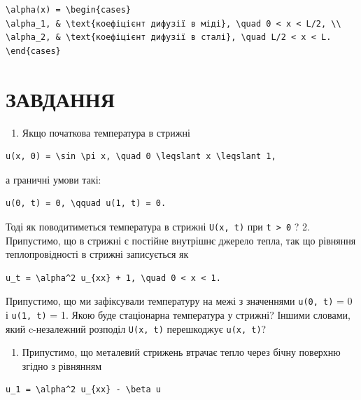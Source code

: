 \documentclass[
  ukrainian,
]{article}
\providecommand{\tightlist}{%
  \setlength{\itemsep}{0pt}\setlength{\parskip}{0pt}}
\begin{document}
\begin{verbatim}
\alpha(x) = \begin{cases}
\alpha_1, & \text{коефіцієнт дифузії в міді}, \quad 0 < x < L/2, \\
\alpha_2, & \text{коефіцієнт дифузії в сталі}, \quad L/2 < x < L.
\end{cases}
\end{verbatim}

\section{ЗАВДАННЯ}\label{ux437ux430ux432ux434ux430ux43dux43dux44f-1}

\begin{enumerate}
\def\labelenumi{\arabic{enumi}.}
\tightlist
\item
  Якщо початкова температура в стрижні
\end{enumerate}

\begin{verbatim}
u(x, 0) = \sin \pi x, \quad 0 \leqslant x \leqslant 1,
\end{verbatim}

а граничні умови такі:

\begin{verbatim}
u(0, t) = 0, \qquad u(1, t) = 0.
\end{verbatim}

Тоді як поводитиметься температура в стрижні \texttt{U(x,\ t)} при
\texttt{t\ \textgreater{}\ 0} ? 2. Припустимо, що в стрижні є постійне
внутрішнє джерело тепла, так що рівняння теплопровідності в стрижні
записується як

\begin{verbatim}
u_t = \alpha^2 u_{xx} + 1, \quad 0 < x < 1.
\end{verbatim}

Припустимо, що ми зафіксували температуру на межі з значеннями
\texttt{u(0,\ t)} = 0 і \texttt{u(1,\ t)} = 1. Якою буде стаціонарна
температура у стрижні? Іншими словами, який c-незалежний розподіл
\texttt{U(x,\ t)} перешкоджує \texttt{u(x,\ t)}?

\begin{enumerate}
\def\labelenumi{\arabic{enumi}.}
\setcounter{enumi}{2}
\tightlist
\item
  Припустимо, що металевий стрижень втрачає тепло через бічну поверхню
  згідно з рівнянням
\end{enumerate}

\begin{verbatim}
u_1 = \alpha^2 u_{xx} - \beta u
\end{verbatim}
\end{document}
